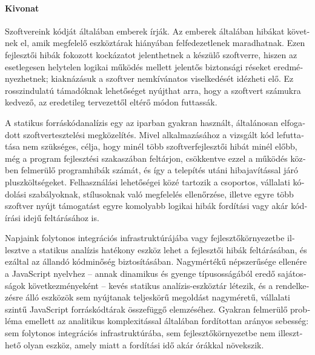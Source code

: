 \begin{otherlanguage}{magyar}

  \paragraph*{Kivonat}
  \thispagestyle{plain}

  Szoftvereink kódját általában emberek írják. Az emberek általában hibákat követnek el, amik megfelelő eszköztárak hiányában felfedezetlenek maradhatnak. Ezen fejlesztői hibák fokozott kockázatot jelenthetnek a készülő szoftverre, hiszen az esetlegesen helytelen logikai működés mellett jelentős biztonsági réseket eredményezhetnek; kiaknázásuk a szoftver nemkívánatos viselkedését idézheti elő. Ez rosszindulatú támadóknak lehetőséget nyújthat arra, hogy a szoftvert számukra kedvező, az eredetileg tervezettől eltérő módon futtassák.

  A statikus forráskódanalízis egy az iparban gyakran használt, általánosan elfogadott szoftvertesztelési megközelítés. Mivel alkalmazásához a vizsgált kód lefuttatása nem szükséges, célja, hogy minél több szoftverfejlesztői hibát minél előbb, még a program fejlesztési szakaszában feltárjon, csökkentve ezzel a működés közben felmerülő programhibák számát, és így a telepítés utáni hibajavítással járó pluszköltségeket. Felhasználási lehetőségei közé tartozik a csoportos, vállalati kódolási szabályoknak, stílusoknak való megfelelés ellenőrzése, illetve egyre több szoftver nyújt támogatást egyre komolyabb logikai hibák fordítási vagy akár kódírási idejű feltárásához is.

  Napjaink folytonos integrációs infrastruktúrájába vagy fejlesztőkörnyezetbe illesztve a statikus analízis hatékony eszköz lehet a fejlesztői hibák feltárásában, és ezáltal az állandó kódminőség biztosításában. Nagymértékű népszerűsége ellenére a JavaScript nyelvhez – annak dinamikus és gyenge típusosságából eredő sajátosságok következményeként – kevés statikus analízis-eszköztár létezik, és a rendelkezésre álló eszközök sem nyújtanak teljeskörű megoldást nagyméretű, vállalati szintű JavaScript forráskódtárak összefüggő elemzéséhez. Gyakran felmerülő probléma emellett az analitikus komplexitással általában fordítottan arányos sebesség: sem folytonos integrációs infrastruktúrába, sem fejlesztőkörnyezetbe nem illeszthető olyan eszköz, amely miatt a fordítási idő akár órákkal növekszik.


\end{otherlanguage}
